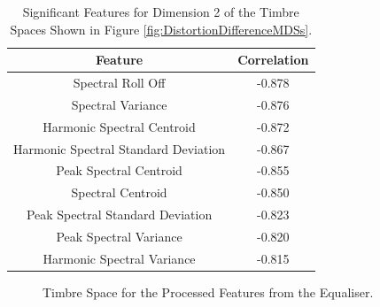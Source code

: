 	\begin{table}[h!]
		\centering
		\begin{tabular}{|c|c|}
			\hline
			\bf{Feature} & \bf{Correlation} \\
			\hline
			\hline
			Spectral Roll Off & -0.878 \\
			\hline
			Spectral Variance & -0.876 \\
			\hline
			Harmonic Spectral Centroid & -0.872 \\
			\hline
			Harmonic Spectral Standard Deviation & -0.867 \\
			\hline
			Peak Spectral Centroid & -0.855 \\
			\hline
			Spectral Centroid & -0.850 \\
			\hline
			Peak Spectral Standard Deviation & -0.823 \\
			\hline
			Peak Spectral Variance & -0.820 \\
			\hline
			Harmonic Spectral Variance & -0.815 \\
			\hline
		\end{tabular}
		\caption{Significant Features for Dimension 2 of the Timbre Spaces Shown in Figure 
			 \ref{fig:DistortionDifferenceMDSs}.}
		\label{tab:DistortionDifferenceFeatures}
	\end{table}

	\begin{figure}[h!]
		\centering
		\qquad
		\caption{Timbre Space for the Processed Features from the Equaliser.}
		\label{fig:EqualiserProcessedMDSs}
	\end{figure}

